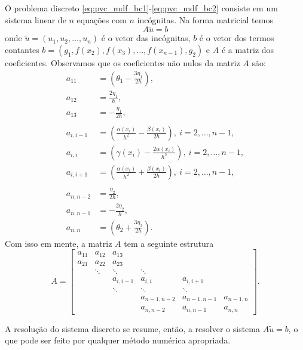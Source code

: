 O problema discreto \eqref{eq:pvc_mdf_bc1}-\eqref{eq:pvc_mdf_bc2} consiste em um sistema linear de $n$ equações com $n$ incógnitas. Na forma matricial temos
\begin{equation}
  A\tilde{u} = b
\end{equation}
onde $\tilde{u} = (u_1, u_2, \dotsc, u_n)$ é o vetor das incógnitas, $b$ é o vetor dos termos contantes $b = (g_1, f(x_2), f(x_3), \dotsc, f(x_{n-1}), g_2)$ e $A$ é a matriz dos coeficientes. Observamos que os coeficientes não nulos da matriz $A$ são:
\begin{align}
  a_{11} &= \left(\theta_1 - \frac{3\eta_1}{2h}\right),\\
  a_{12} &= \frac{2\eta_1}{h},\\
  a_{13} &= - \frac{\eta_1}{2h},\\
  & ~ \nonumber \\
  a_{i,i-1} &= \left(\frac{\alpha(x_i)}{h^2}-\frac{\beta(x_i)}{2h}\right), ~i=2, \dotsc, n-1,\\
  a_{i,i} &= \left(\gamma(x_i) - \frac{2\alpha(x_i)}{h^2}\right), ~i=2, \dotsc, n-1, \\
  a_{i,i+1} &= \left(\frac{\alpha(x_i)}{h^2}+\frac{\beta(x_i)}{2h}\right), ~i=2, \dotsc, n-1,\\
  & ~ \nonumber \\
  a_{n,n-2} &= \frac{\eta_2}{2h},\\
  a_{n,n-1} &= - \frac{2\eta_2}{h},\\
  a_{n,n} &= \left(\theta_2 + \frac{3\eta_2}{2h}\right).
\end{align}
Com isso em mente, a matriz $A$ tem a seguinte estrutura
\begin{equation}
  A = \begin{bmatrix}
    a_{11} & a_{12} & a_{13} \\
    a_{21} & a_{22} & a_{23} \\
      & \ddots  & \ddots & \ddots \\
      & & a_{i,i-1} & a_{i,i} & a_{i,i+1} \\
      & & \ddots  & \ddots & \ddots \\
      & & & a_{n-1,n-2} & a_{n-1,n-1} & a_{n-1,n} \\
      & & & a_{n,n-2} & a_{n,n-1} & a_{n,n}
  \end{bmatrix}.
\end{equation}

A resolução do sistema discreto se resume, então, a resolver o sistema $A\tilde{u} = b$, o que pode ser feito por qualquer método numérica apropriada.


